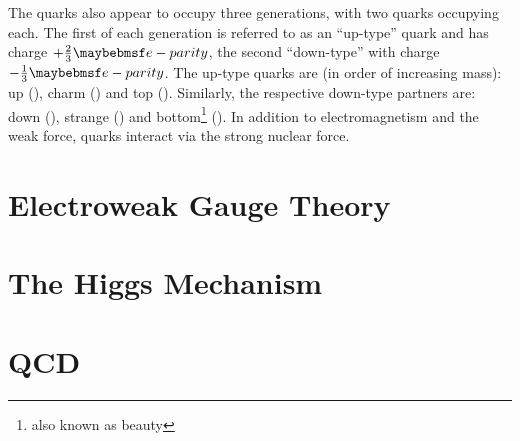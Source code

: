The quarks also appear to occupy three generations, with two quarks occupying
each. The first of each generation is referred to as an ``up-type'' quark and
has charge $+\frac{2}{3}\ec$, the second ``down-type'' with charge
$-\frac{1}{3}\ec$. The up-type quarks are (in order of increasing mass): up
(\Pup), charm (\Pcharm) and top (\Ptop). Similarly, the respective down-type
partners are: down (\Pdown), strange (\Pstrange) and bottom\footnote{also known
  as beauty} (\Pbottom). In addition to electromagnetism and the weak force,
quarks interact via the strong nuclear force.



\section{Electroweak Gauge Theory}
\section{The Higgs Mechanism}
\section{\acl{QCD}}
